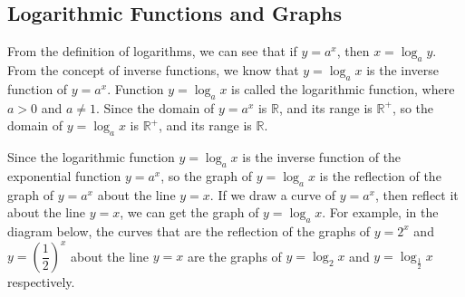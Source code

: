 \documentclass[12pt]{report}
\begin{document}
\subsection*{Logarithmic Functions and Graphs}

From the definition of logarithms, we can see that if $y = a^x$, then $x =
    \log_a y$. From the concept of inverse functions, we know that $y = \log_a x$
is the inverse function of $y = a^x$. Function $y = \log_a x$ is called the
logarithmic function, where $a > 0$ and $a \neq 1$. Since the domain of $y =
    a^x$ is $\mathbb{R}$, and its range is $\mathbb{R}^+$, so the domain of $y =
    \log_a x$ is $\mathbb{R}^+$, and its range is $\mathbb{R}$.

Since the logarithmic function $y = \log_a x$ is the inverse function of the
exponential function $y = a^x$, so the graph of $y = \log_a x$ is the
reflection of the graph of $y = a^x$ about the line $y = x$. If we draw a curve
of $y = a^x$, then reflect it about the line $y = x$, we can get the graph of
$y = \log_a x$. For example, in the diagram below, the curves that are the
reflection of the graphs of $y = 2^x$ and $y = \left(\dfrac{1}{2}\right)^x$
about the line $y = x$ are the graphs of $y = \log_2 x$ and $y =
    \log_\frac{1}{2} x$ respectively.
\end{document}
